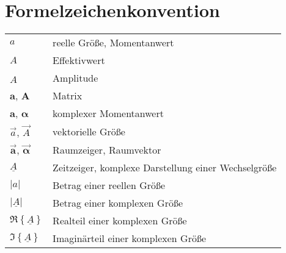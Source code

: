 \chapter*{Formelzeichenkonvention}



\begin{tabular}{ll}
    $a$
        & reelle Größe, Momentanwert\\
    $A$
        & Effektivwert\\
    $\hat A$
        & Amplitude\\
    $\textbf{a}$, $\textbf{A}$
        & Matrix\\
    $\bm{a}$, $\bm{\alpha}$
        & komplexer Momentanwert\\
    $\vec{a}$, $\vec{A}$
        & vektorielle Größe\\
    $\vec{\bm{a}}$, $\vec{\bm{\alpha}}$
        & Raumzeiger, Raumvektor\\
    $\underline{A}$
        & Zeitzeiger, komplexe Darstellung einer Wechselgröße\\
    $\left|a\right|$
        & Betrag einer reellen Größe\\
    $\left|\underline{A}\right|$
        & Betrag einer komplexen Größe\\
    $\Re\left\{\underline{A}\right\}$
        & Realteil einer komplexen Größe\\
    $\Im\left\{\underline{A}\right\}$
        & Imaginärteil einer komplexen Größe\\
\end{tabular}
